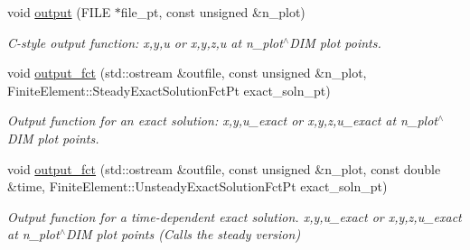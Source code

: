 \begin{DoxyCompactItemize}
void \hyperlink{classoomph_1_1BellShellElement_a6f203728a7d113a2b1029d18f7bff533}{output} (F\+I\+LE $\ast$file\+\_\+pt, const unsigned \&n\+\_\+plot)
\begin{DoxyCompactList}\small\item\em C-\/style output function\+: x,y,u or x,y,z,u at n\+\_\+plot$^\wedge$\+D\+IM plot points. \end{DoxyCompactList}\item 
void \hyperlink{classoomph_1_1BellShellElement_aaf6d152626e653db12f0d6d3c71b0fef}{output\+\_\+fct} (std\+::ostream \&outfile, const unsigned \&n\+\_\+plot, Finite\+Element\+::\+Steady\+Exact\+Solution\+Fct\+Pt exact\+\_\+soln\+\_\+pt)
\begin{DoxyCompactList}\small\item\em Output function for an exact solution\+: x,y,u\+\_\+exact or x,y,z,u\+\_\+exact at n\+\_\+plot$^\wedge$\+D\+IM plot points. \end{DoxyCompactList}\item 
void \hyperlink{classoomph_1_1BellShellElement_a5589f860978d78c64278afdbc72f5f5d}{output\+\_\+fct} (std\+::ostream \&outfile, const unsigned \&n\+\_\+plot, const double \&time, Finite\+Element\+::\+Unsteady\+Exact\+Solution\+Fct\+Pt exact\+\_\+soln\+\_\+pt)
\begin{DoxyCompactList}\small\item\em Output function for a time-\/dependent exact solution. x,y,u\+\_\+exact or x,y,z,u\+\_\+exact at n\+\_\+plot$^\wedge$\+D\+IM plot points (Calls the steady version) \end{DoxyCompactList}\end{DoxyCompactItemize}
